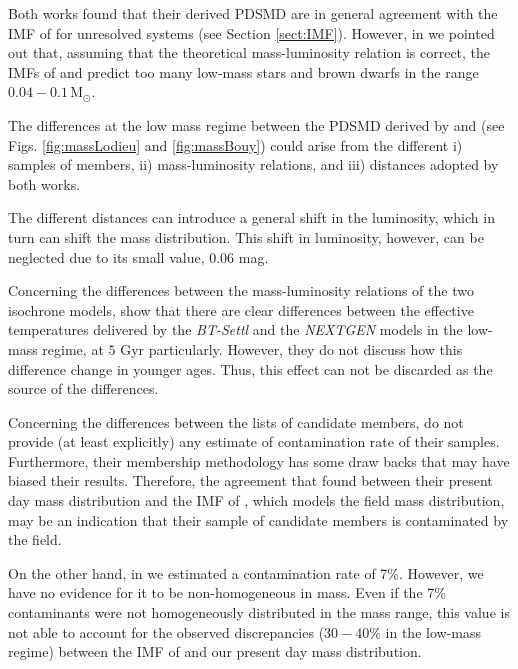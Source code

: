 Both works found that their derived PDSMD are in general agreement with the IMF of \citet{Chabrier2005} for unresolved systems (see Section \ref{sect:IMF}). However, in \citet{Bouy2015} we pointed out that, assuming that the theoretical mass-luminosity relation is correct, the IMFs of \citet{Chabrier2005} and \citet{Thies2007} predict too many low-mass stars and brown dwarfs in the range $0.04-0.1\,\mathrm{M_{\odot}}$. 

The differences at the low mass regime between the PDSMD derived by \citet{Lodieu2012} and \citet{Bouy2015} (see Figs. \ref{fig:massLodieu} and \ref{fig:massBouy}) could arise from the different i) samples of members, ii) mass-luminosity relations, and iii) distances adopted by both works.

The different distances can introduce a general shift in the luminosity, which in turn can shift the mass distribution. This shift in luminosity, however, can be neglected due to its small value, $0.06$ mag.

Concerning the differences between the mass-luminosity relations of the two isochrone models, \citet{2013MmSAI..84.1053A} show that there are clear differences between the effective temperatures delivered by the \emph{BT-Settl} and the \emph{NEXTGEN} models in the low-mass regime, at $5$ Gyr particularly. {However, they do not discuss how this difference change in younger ages. Thus, this effect can not be discarded as the source of the differences.}

Concerning the differences between the lists of candidate members, \citet{Lodieu2012} do not provide (at least explicitly) any estimate of contamination rate of their samples. Furthermore, their membership methodology has some draw backs \cite[see][]{Sarro2014} that may have biased their results. {Therefore, the agreement that \citet{Lodieu2012} found between their present day mass distribution and the IMF of \citet{Chabrier2005}, which models the field mass distribution, may be an indication that their sample of candidate members is contaminated by the field.  }

On the other hand, in \citet{Bouy2015} we estimated a contamination rate of 7\%. However, we have no evidence for it to be non-homogeneous in mass. Even if the 7\% contaminants were not homogeneously distributed in the mass range, this value is not able to account for the observed discrepancies ($30-40\%$ in the low-mass regime) between the IMF of \citet{Chabrier2005} and our present day mass distribution.

